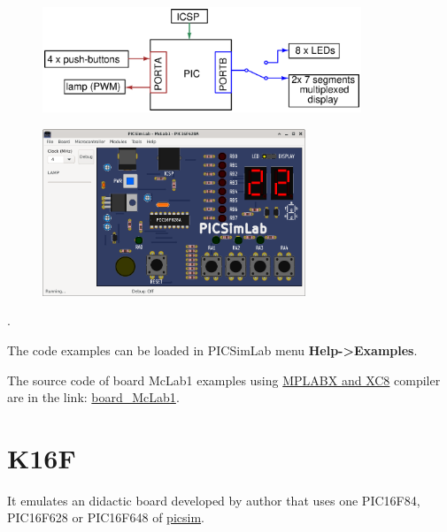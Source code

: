 \begin{figure}[H]
\center
\includegraphics[width=0.85\textwidth]{img/blocks_p1.eps} 
\end{figure} 


\begin{figure}[H]
\center
\includegraphics[width=0.7\textwidth]{img/picsimlab1.png} 
\end{figure} 

.\vspace{0.5cm}

The code examples can be loaded in PICSimLab menu \textbf{Help->Examples}.

The source code of board McLab1 examples using \href{http://www.microchip.com/mplabx}{MPLABX and XC8} compiler 
are in the link: \href{https://lcgamboa.github.io/picsimlab_examples/board_McLab1.html}{board\_McLab1}.




\section{K16F}

It emulates an didactic board developed by author that uses one PIC16F84, PIC16F628 or PIC16F648 of \href{https://github.com/lcgamboa/picsim}{picsim}.

